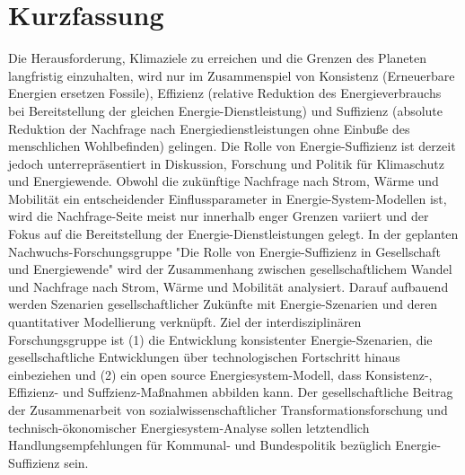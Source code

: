\documentclass[a4paper,11pt,twoside]{scrartcl}
\begin{document}
\onehalfspacing

\clearpage


{\singlespacing

}

\setcounter{page}{1}


\section*{Kurzfassung}
Die Herausforderung, Klimaziele zu erreichen und die Grenzen des Planeten langfristig einzuhalten, wird nur im Zusammenspiel von Konsistenz (Erneuerbare Energien ersetzen Fossile), Effizienz (relative Reduktion des Energieverbrauchs bei Bereitstellung der gleichen Energie-Dienstleistung) und Suffizienz (absolute Reduktion der Nachfrage nach Energiedienstleistungen ohne Einbuße des menschlichen Wohlbefinden) gelingen. Die Rolle von Energie-Suffizienz ist derzeit jedoch unterrepräsentiert in Diskussion, Forschung und Politik für Klimaschutz und Energiewende. Obwohl die zukünftige Nachfrage nach Strom, Wärme und Mobilität ein entscheidender Einflussparameter in Energie-System-Modellen ist, wird die Nachfrage-Seite meist nur innerhalb enger Grenzen variiert und der Fokus auf die Bereitstellung der Energie-Dienstleistungen gelegt.
In der geplanten Nachwuchs-Forschungsgruppe "Die Rolle von Energie-Suffizienz in Gesellschaft und Energiewende" wird der Zusammenhang zwischen gesellschaftlichem Wandel und Nachfrage nach Strom, Wärme und Mobilität analysiert. Darauf aufbauend werden Szenarien gesellschaftlicher Zukünfte mit Energie-Szenarien und deren quantitativer Modellierung verknüpft. Ziel der interdisziplinären Forschungsgruppe ist (1) die Entwicklung konsistenter Energie-Szenarien, die gesellschaftliche Entwicklungen über technologischen Fortschritt hinaus einbeziehen und (2) ein open source Energiesystem-Modell, dass Konsistenz-, Effizienz- und Suffzienz-Maßnahmen abbilden kann. Der gesellschaftliche Beitrag der Zusammenarbeit von sozialwissenschaftlicher Transformationsforschung und technisch-ökonomischer Energiesystem-Analyse sollen letztendlich Handlungsempfehlungen für Kommunal- und Bundespolitik bezüglich Energie-Suffizienz sein.
\end{document}
